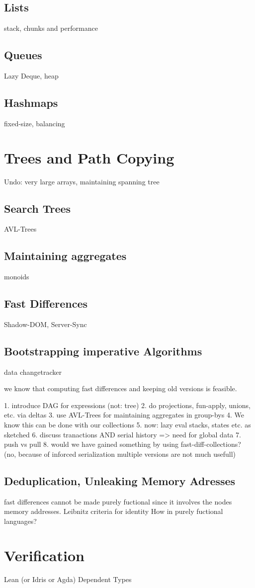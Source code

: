 \documentclass{book}
\begin{document}
\section{Lists}
stack, chunks and performance

\section{Queues}
Lazy Deque, heap

\section{Hashmaps}
fixed-size, balancing


\chapter{Trees and Path Copying}


Undo: 
very large arrays, maintaining spanning tree

\section{Search Trees}
AVL-Trees


\section{Maintaining aggregates}
monoids

\section{Fast Differences}
Shadow-DOM, Server-Sync


\section{Bootstrapping imperative Algorithms}
data changetracker


we know that computing fast differences and keeping old versions is feasible.

1. introduce DAG for expressions (not: tree)
2. do projections, fun-apply, unions, etc. via deltas
3. use AVL-Trees for maintaining aggregates in group-bys
4. We know this can be done with our collections
5. now: lazy eval stacks, states etc. as sketched
6. discuss tranactions AND serial history => need for global data
7. push vs pull
8. would we have gained something by using fast-diff-collections? (no, because of inforced serialization multiple versions are not much usefull)


\section{Deduplication, Unleaking Memory Adresses}
fast differences cannot be made purely fuctional since it involves the nodes memory addresses.
Leibnitz criteria for identity
How in purely fuctional languages?

\chapter{Verification}
Lean (or Idris or Agda) Dependent Types
\end{document}

